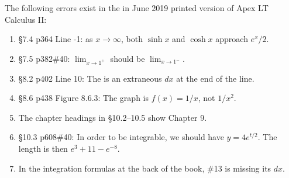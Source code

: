 \documentclass{amsart}
\newcommand{\ds}{\displaystyle}
\begin{document}
The following errors exist in the in June 2019 printed version of Apex LT Calculus II:
\begin{enumerate}
\item \S7.4 p364 Line -1: as $x\to\infty$, both $\sinh x$ and $\cosh x$ approach $e^x/2$.
\item \S7.5 p382\#40: $\ds\lim_{x\to1^+}$ should be $\ds\lim_{x\to1^-}$.
\item \S8.2 p402 Line 10: The is an extraneous $dx$ at the end of the line.
\item \S8.6 p438 Figure 8.6.3: The graph is $f(x)=1/x$, not $1/x^2$.
\item The chapter headings in \S10.2--10.5 show Chapter 9.
\item \S10.3 p608\#40: In order to be integrable, we should have $y=4e^{t/2}$.  The length is then $e^3+11-e^{-8}$.
\item In the integration formulas at the back of the book, \#13 is missing its $dx$.
\label{2019-06-00II}
\end{enumerate}
\end{document}
